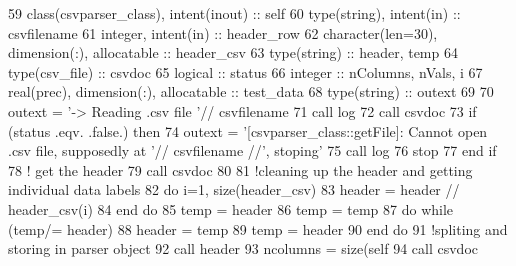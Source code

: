 \begin{DoxyCode}
59     \textcolor{keywordtype}{class}(csvparser\_class), \textcolor{keywordtype}{intent(inout)} :: self
60     \textcolor{keywordtype}{type}(string), \textcolor{keywordtype}{intent(in)} :: csvfilename
61     \textcolor{keywordtype}{integer}, \textcolor{keywordtype}{intent(in)} :: header\_row
62     \textcolor{keywordtype}{character(len=30)}, \textcolor{keywordtype}{dimension(:)}, \textcolor{keywordtype}{allocatable} :: header\_csv
63     \textcolor{keywordtype}{type}(string) :: header, temp
64     \textcolor{keywordtype}{type}(csv\_file) :: csvdoc
65     \textcolor{keywordtype}{logical} :: status
66     \textcolor{keywordtype}{integer} :: nColumns, nVals, i
67     \textcolor{keywordtype}{real(prec)}, \textcolor{keywordtype}{dimension(:)}, \textcolor{keywordtype}{allocatable} :: test\_data
68     \textcolor{keywordtype}{type}(string) :: outext
69 
70     outext = \textcolor{stringliteral}{'-> Reading .csv file '}// csvfilename
71     \textcolor{keyword}{call }log%
72     \textcolor{keyword}{call }csvdoc%
73     \textcolor{keywordflow}{if} (status .eqv. .false.) \textcolor{keywordflow}{then}
74         outext = \textcolor{stringliteral}{'[csvparser\_class::getFile]: Cannot open .csv file, supposedly at '}// csvfilename //\textcolor{stringliteral}{',
       stoping'}
75         \textcolor{keyword}{call }log%
76         stop
77 \textcolor{keywordflow}{    end if}
78     \textcolor{comment}{! get the header}
79     \textcolor{keyword}{call }csvdoc%
80 
81     \textcolor{comment}{!cleaning up the header and getting individual data labels}
82     \textcolor{keywordflow}{do} i=1, \textcolor{keyword}{size}(header\_csv)
83         header = header // header\_csv(i)
84 \textcolor{keywordflow}{    end do}
85     temp = header%
86     temp = temp%
87     \textcolor{keywordflow}{do} \textcolor{keywordflow}{while} (temp/= header)
88         header = temp
89         temp = header%
90 \textcolor{keywordflow}{    end do}
91     \textcolor{comment}{!spliting and storing in parser object}
92     \textcolor{keyword}{call }header%
93     ncolumns = \textcolor{keyword}{size}(self%
94     \textcolor{keyword}{call }csvdoc%

\end{DoxyCode}
